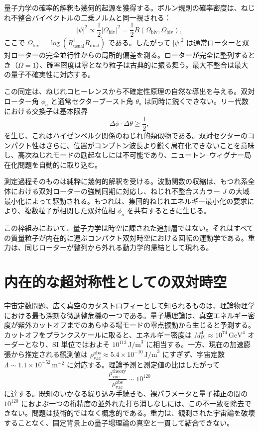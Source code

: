 \documentclass[a4paper]{article}
\begin{document}
量子力学の確率的解釈も幾何的起源を獲得する。ボルン規則の確率密度は、ねじれ不整合バイベクトルの二乗ノルムと同一視される：
\[
|\psi|^2 \propto \frac{1}{2} |\Omega_\text{biv}|^2 = \frac{1}{2} B(\Omega_\text{biv}, \Omega_\text{biv}),
\]
ここで $\Omega_\text{biv} = \log(R_\text{usual}^\dagger R_\text{dual})$ である。したがって $|\psi|^2$ は通常ローターと双対ローターの完全並行性からの局所的偏差を測る。ローターが完全に整列するとき（$\Omega = 1$）、確率密度は零となり粒子は古典的に振る舞う。最大不整合は最大の量子不確実性に対応する。

この同定は、ねじれコヒーレンスから不確定性原理の自然な導出を与える。双対ローター角 $\phi_a$ と通常セクターブースト角 $\theta_a$ は同時に鋭くできない。リー代数における交換子は基本限界
\[
\Delta\phi \cdot \Delta\theta \geq \frac{1}{2},
\]
を生じ、これはハイゼンベルク関係のねじれ的類似物である。双対セクターのコンパクト性はさらに、位置がコンプトン波長より鋭く局在化できないことを意味し、高次ねじれモードの励起なしには不可能であり、ニュートン--ウィグナー局在化問題を自動的に取り込む。

測定過程そのものは純粋に幾何的解釈を受ける。波動関数の収縮は、もつれ系全体における双対ローターの強制同期に対応し、ねじれ不整合スカラー $J$ の大域最小化によって駆動される。もつれは、集団的ねじれエネルギー最小化の要求により、複数粒子が相関した双対位相 $\phi_a$ を共有するときに生じる。

この枠組みにおいて、量子力学は時空に課された追加層ではない。それはすべての質量粒子が内在的に運ぶコンパクト双対時空における回転の運動学である。重力は、同じローターが整列から外れる動力学的帰結として現れる。

\section{内在的な超対称性としての双対時空}
\label{sec:susy}

宇宙定数問題、広く真空のカタストロフィーとして知られるものは、理論物理学における最も深刻な微調整危機の一つである。量子場理論は、真空エネルギー密度が紫外カットオフまでのあらゆる場モードの零点振動から生じると予測する。カットオフをプランクスケールに取ると、エネルギー密度は \(M_\text{Pl}^4 \approx 10^{74}\,\text{GeV}^4\) オーダーとなり、SI 単位ではおよそ \(10^{113}\,\text{J/m}^3\) に相当する。一方、現在の加速膨張から推定される観測値は \(\rho_\text{vac}^\text{obs} \approx 5.4 \times 10^{-10}\,\text{J/m}^3\) にすぎず、宇宙定数 \(\Lambda \sim 1.1 \times 10^{-52}\,\text{m}^{-2}\) に対応する。理論予測と測定値の比はしたがって
\[
\frac{\rho_\text{vac}^\text{theory}}{\rho_\text{vac}^\text{obs}} \sim 10^{120}
\]
に達する。既知のいかなる繰り込み手続きも、裸パラメータと量子補正の間の \(10^{120}\) におよぶ一つの桁精度の並外れた打ち消しなしには、この不一致を除去できない。問題は技術的ではなく概念的である。重力は、観測された宇宙論を破壊することなく、固定背景上の量子場理論の真空と一貫して結合できない。
\end{document}
